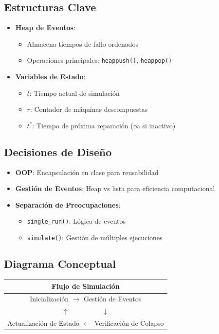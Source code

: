 \documentclass[a4paper, 12pt]{article}
\begin{document}
\subsection*{Estructuras Clave}
\begin{itemize}
    \item \textbf{Heap de Eventos}:
    \begin{itemize}
        \item Almacena tiempos de fallo ordenados
        \item Operaciones principales: \texttt{heappush()}, \texttt{heappop()}
    \end{itemize}
    
    \item \textbf{Variables de Estado}:
    \begin{itemize}
        \item $t$: Tiempo actual de simulación
        \item $r$: Contador de máquinas descompuestas
        \item $t^*$: Tiempo de próxima reparación ($\infty$ si inactivo)
    \end{itemize}
\end{itemize}



\subsection*{Decisiones de Diseño}
\begin{itemize}
    \item \textbf{OOP}: Encapsulación en clase para reusabilidad
    \item \textbf{Gestión de Eventos}: Heap vs lista para eficiencia computacional
    \item \textbf{Separación de Preocupaciones}:
    \begin{itemize}
        \item \texttt{single\_run()}: Lógica de eventos
        \item \texttt{simulate()}: Gestión de múltiples ejecuciones
    \end{itemize}
\end{itemize}

\subsection*{Diagrama Conceptual}
\begin{center}
\begin{tabular}{|c|}
\hline
\textbf{Flujo de Simulación} \\
\hline
Inicialización $\rightarrow$ Gestión de Eventos \\
$\uparrow \hspace{2cm} \downarrow$ \\
Actualización de Estado $\leftarrow$ Verificación de Colapso \\
\hline
\end{tabular}
\end{center}
\end{document}
